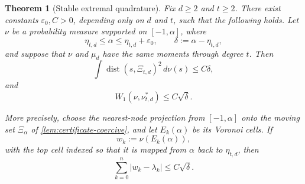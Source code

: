 \documentclass[11pt]{amsart}
\newtheorem{theorem}{Theorem}[section]
\theoremstyle{definition}
\theoremstyle{remark}
\begin{document}
\begin{theorem}[Stable extremal quadrature]\label{thm:stable-quadrature}
Fix $d\ge2$ and $t\ge2$.  There exist constants $\varepsilon_0,C>0$, depending only on $d$ and $t$, such that the following holds.  Let $\nu$ be a probability measure supported on $[-1,\alpha]$, where
\[
 \eta_{t,d}\le\alpha\le\eta_{t,d}+\varepsilon_0,
 \qquad
 \delta:=\alpha-\eta_{t,d},
\]
and suppose that $\nu$ and $\mu_d$ have the same moments through degree $t$.  Then
\begin{equation}\label{eq:mean-square-clustering}
 \boxed{
 \int \operatorname{dist}(s,\Xi_{t,d})^2\,d\nu(s)
 \le C\delta,}
\end{equation}
and
\begin{equation}\label{eq:W1-stable}
 \boxed{
 W_1(\nu,\nu_{t,d}^*)\le C\sqrt\delta.}
\end{equation}

More precisely, choose the nearest-node projection from $[-1,\alpha]$ onto the moving set $\Xi_\alpha$ of \cref{lem:certificate-coercive}, and let $E_k(\alpha)$ be its Voronoi cells.  If
\[
 w_k:=\nu(E_k(\alpha)),
\]
with the top cell indexed so that it is mapped from $\alpha$ back to $\eta_{t,d}$, then
\begin{equation}\label{eq:weight-stability}
 \boxed{
 \sum_{k=0}^n|w_k-\lambda_k|\le C\sqrt\delta.}
\end{equation}
\end{theorem}
\end{document}
